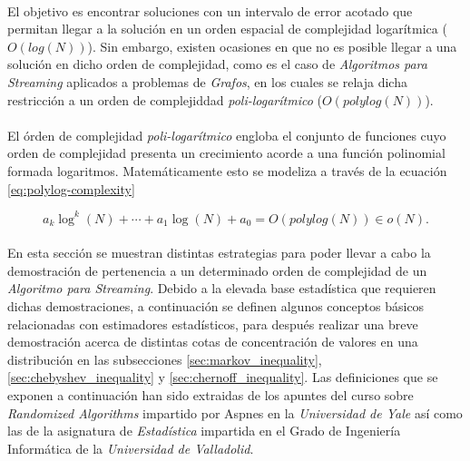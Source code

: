 \documentclass{subfiles}
\begin{document}
      \paragraph{}
      El objetivo es encontrar soluciones con un intervalo de error acotado que permitan llegar a la solución en un orden espacial de complejidad logarítmica ($O(log(N))$). Sin embargo, existen ocasiones en que no es posible llegar a una solución en dicho orden de complejidad, como es el caso de \emph{Algoritmos para Streaming} aplicados a problemas de \emph{Grafos}, en los cuales se relaja dicha restricción a un orden de complejiddad \emph{poli-logarítmico} ($O(polylog(N))$).

      \paragraph{}
      El órden de complejidad \emph{poli-logarítmico} engloba el conjunto de funciones cuyo orden de complejidad presenta un crecimiento acorde a una función polinomial formada logaritmos. Matemáticamente esto se modeliza a través de la ecuación \eqref{eq:polylog-complexity}

      \begin{equation}
      \label{eq:polylog-complexity}
        a_{k}\log ^{k}(N)+\cdots +a_{1}\log(N)+a_{0} = O(polylog(N)) \in o(N).
      \end{equation}

      \paragraph{}
      En esta sección se muestran distintas estrategias para poder llevar a cabo la demostración de pertenencia a un determinado orden de complejidad de un \emph{Algoritmo para Streaming}. Debido a la elevada base estadística que requieren dichas demostraciones, a continuación se definen algunos conceptos básicos relacionadas con estimadores estadísticos, para después realizar una breve demostración acerca de distintas cotas de concentración de valores en una distribución en las subsecciones \ref{sec:markov_inequality}, \ref{sec:chebyshev_inequality} y \ref{sec:chernoff_inequality}. Las definiciones que se exponen a continuación han sido extraidas de los apuntes del curso sobre \emph{Randomized Algorithms} \cite{aspnes2014notes} impartido por Aspnes en la \emph{Universidad de Yale} así como las de la asignatura de \emph{Estadística}\cite{estadistica2016notes} impartida en el Grado de Ingeniería Informática de la \emph{Universidad de Valladolid}.
\end{document}
